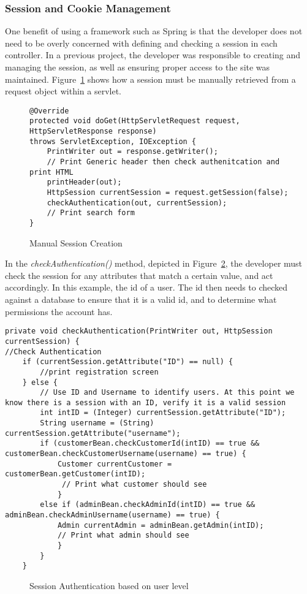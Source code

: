 \subsubsection{Session and Cookie Management}
One benefit of using a framework such as Spring is that the developer does not need to be overly concerned with defining and checking a session in each controller. In a previous project, the developer was responsible to creating and managing the session, as well as ensuring proper access to the site was maintained. Figure~\ref{fig:manualsession} shows how a session must be manually retrieved from a request object within a servlet.

\begin{figure}[H]
\begin{lstlisting}
@Override
protected void doGet(HttpServletRequest request, HttpServletResponse response)
throws ServletException, IOException {
    PrintWriter out = response.getWriter();
    // Print Generic header then check authenitcation and print HTML
    printHeader(out);
    HttpSession currentSession = request.getSession(false);
    checkAuthentication(out, currentSession);
    // Print search form
}
\end{lstlisting}
\caption{Manual Session Creation}
\label{fig:manualsession}
\end{figure}

In the \textit{checkAuthentication()} method, depicted in Figure~\ref{fig:sessionlevel}, the developer must check the session for any attributes that match a certain value, and act accordingly. In this example, the id of a user. The id then needs to checked against a database to ensure that it is a valid id, and to determine what permissions the account has.


\begin{lstlisting}
private void checkAuthentication(PrintWriter out, HttpSession currentSession) {
//Check Authentication
	if (currentSession.getAttribute("ID") == null) {
		//print registration screen
    } else {
        // Use ID and Username to identify users. At this point we know there is a session with an ID, verify it is a valid session
        int intID = (Integer) currentSession.getAttribute("ID");
        String username = (String) currentSession.getAttribute("username");
        if (customerBean.checkCustomerId(intID) == true && customerBean.checkCustomerUsername(username) == true) {
			Customer currentCustomer = customerBean.getCustomer(intID);
			 // Print what customer should see
            } 
		else if (adminBean.checkAdminId(intID) == true && adminBean.checkAdminUsername(username) == true) {
            Admin currentAdmin = adminBean.getAdmin(intID);
			// Print what admin should see   
            }
        }
	}
\end{lstlisting}
\begin{figure}[H]
\caption{Session Authentication based on user level}
\label{fig:sessionlevel}
\end{figure}

